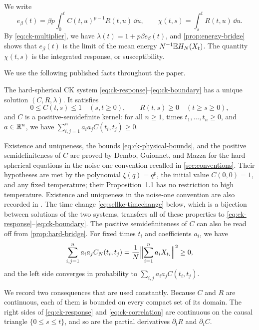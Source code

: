 We write
\begin{equation}\label{eq:energy-chi-def}
 e_\beta(t)=\beta p\int_0^tC(t,u)^{p-1}R(t,u)\,\dd u,\qquad
 \chi(t,s)=\int_s^tR(t,u)\,\dd u.
\end{equation}
By \eqref{eq:ck-multiplier}, we have $\lambda(t)=1+p\beta e_\beta(t)$, and \cref{prop:energy-bridge} shows that $e_\beta(t)$ is the limit of the mean energy $N^{-1}\mathbb E H_N(X_t)$. The quantity $\chi(t,s)$ is the integrated response, or susceptibility.

We use the following published facts throughout the paper.

\begin{proposition}\label{prop:ck-wellposed}
The hard-spherical CK system \eqref{eq:ck-response}--\eqref{eq:ck-boundary} has a unique solution $(C,R,\lambda)$. It satisfies
\begin{equation}
0\le C(t,s)\le1\quad(s,t\ge0),\qquad R(t,s)\ge0\quad(t\ge s\ge0),
\label{eq:ck-physical-bounds}
\end{equation}
and $C$ is a positive-semidefinite kernel: for all $n\ge1$, times $t_1,\dots,t_n\ge0$, and $a\in\mathbb R^n$, we have $\sum_{i,j=1}^na_ia_jC(t_i,t_j)\ge0$.
\end{proposition}

Existence and uniqueness, the bounds \eqref{eq:ck-physical-bounds}, and the positive semidefiniteness of $C$ are proved by Dembo, Guionnet, and Mazza \cite[arXiv version~1, Proposition~1.1, p.~4, and Lemma~2.1, p.~6]{dgm2007} for the hard-spherical equations in the noise-one convention recalled in \cref{sec:conventions}. Their hypotheses are met by the polynomial $\xi(q)=q^p$, the initial value $C(0,0)=1$, and any fixed temperature; their Proposition~1.1 has no restriction to high temperature. Existence and uniqueness in the noise-one convention are also recorded in \cite[arXiv version~5, Proposition~4.2, p.~23]{sellke2024}. The time change \eqref{eq:sellke-timechange} below, which is a bijection between solutions of the two systems, transfers all of these properties to \eqref{eq:ck-response}--\eqref{eq:ck-boundary}. The positive semidefiniteness of $C$ can also be read off from \cref{prop:hard-bridge}. For fixed times $t_i$ and coefficients $a_i$, we have
\[
 \sum_{i,j=1}^na_ia_jC_N(t_i,t_j)=\frac1N\Bigl\|\sum_{i=1}^na_iX_{t_i}\Bigr\|^2\ge0,
\]
and the left side converges in probability to $\sum_{i,j}a_ia_jC(t_i,t_j)$.

We record two consequences that are used constantly. Because $C$ and $R$ are continuous, each of them is bounded on every compact set of its domain. The right sides of \eqref{eq:ck-response} and \eqref{eq:ck-correlation} are continuous on the causal triangle $\{0\le s\le t\}$, and so are the partial derivatives $\partial_tR$ and $\partial_tC$.

